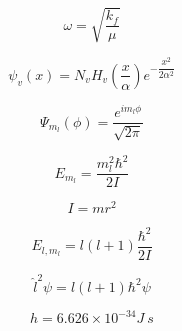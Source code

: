 \documentclass[12pt, letterpaper]{memoir}
\begin{document}
		\begin{minipage}{0.495\textwidth}
		
				
			\begin{equation*}
				\omega=\sqrt{\dfrac{k_f}{\mu}}
			\end{equation*}			
			
			\begin{equation*}
				\psi_v(x) = N_vH_v\left(\dfrac{x}{\alpha}\right)e^{-\dfrac{x^2}{2\alpha^2}}
			\end{equation*}
		
			\begin{equation*}
				\Psi_{m_l}(\phi)=\frac{e^{im_l\phi}}{\sqrt{2\pi}}
			\end{equation*}
			
			\begin{equation*}
				E_{m_l}=\frac{m_l^2\hbar^2}{2I}
			\end{equation*}
			
			\begin{equation*}
				I=mr^2
			\end{equation*}
		
			\begin{equation*}
				E_{l,m_l}=l(l+1)\dfrac{\hbar^2}{2I}
			\end{equation*}
			
			\begin{equation*}
				\hat{l}^2\psi=l(l+1)\hbar^2\psi
			\end{equation*}		
		
			\begin{equation*}
				h = 6.626\times10^{-34}J~s
			\end{equation*}
					
		\end{minipage}
\end{document}
